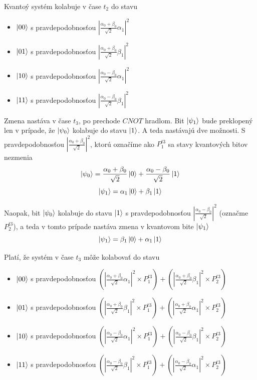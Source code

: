 Kvantoý systém kolabuje v čase \(t_2\) do stavu
    \begin{itemize}
        \item[] \(\ket{00}\) s pravdepodobnosťou \(|\frac{\alpha_0 + \beta_0}{\sqrt{2}}\alpha_1|^2\)
        \item[] \(\ket{01}\) s pravdepodobnosťou \(|\frac{\alpha_0 + \beta_0}{\sqrt{2}}\beta_1|^2\)
        \item[] \(\ket{10}\) s pravdepodobnosťou \(|\frac{\alpha_0 - \beta_0}{\sqrt{2}}\alpha_1|^2\)
        \item[] \(\ket{11}\) s pravdepodobnosťou \(|\frac{\alpha_0 - \beta_0}{\sqrt{2}}\beta_1|^2\) 
    \end{itemize}

Zmena nastáva v čase \(t_3\), po prechode \(CNOT\) hradlom. Bit \(\ket{\psi_1}\)
bude preklopený len v prípade, že \(\ket{\psi_0}\) kolabuje do stavu 
\(\ket{1}\). A teda nastávajú dve možnosti. S pravdepodobnosťou 
\(|\frac{\alpha_0 + \beta_0}{\sqrt{2}}|^2\), ktorú označíme ako \(P^{t3}_1\) sa 
stavy kvantových bitov nezmenia
\[\ket{\psi_0} = \frac{\alpha_0 + \beta_0}{\sqrt{2}}\ket{0} + \frac{\alpha_0 - \beta_0}{\sqrt{2}}\ket{1}\]
\[\ket{\psi_1} = \alpha_1\ket{0} + \beta_1\ket{1}\]

Naopak, bit \(\ket{\psi_0}\) kolabuje do stavu \(\ket{1}\) s pravdepodobnosťou
\(|\frac{\alpha_0 - \beta_0}{\sqrt{2}}|^2\) (označme \(P^{t3}_{2}\)), a teda 
v tomto prípade nastáva zmena v kvantovom bite \(\ket{\psi_1}\)
\[\ket{\psi_1} = \beta_1\ket{0} + \alpha_1\ket{1}\]

Platí, že systém v čase \(t_3\) môže kolabovať do stavu
    \begin{itemize}
        \item[] \(\ket{00}\) s pravdepodobnosťou \((|\frac{\alpha_0 + \beta_0}{\sqrt{2}}\alpha_1|^2 \times P^{t3}_1) + (|\frac{\alpha_0 + \beta_0}{\sqrt{2}}\beta_1|^2 \times P^{t3}_{2})\)
        \item[] \(\ket{01}\) s pravdepodobnosťou \((|\frac{\alpha_0 + \beta_0}{\sqrt{2}}\beta_1|^2 \times P^{t3}_1 ) +(|\frac{\alpha_0 + \beta_0}{\sqrt{2}}\alpha_1|^2 \times P^{t3}_2)\)
        \item[] \(\ket{10}\) s pravdepodobnosťou \((|\frac{\alpha_0 - \beta_0}{\sqrt{2}}\alpha_1|^2 \times P^{t3}_1) +  (|\frac{\alpha_0 - \beta_0}{\sqrt{2}}\beta_1|^2 \times P^{t3}_2)\)
        \item[] \(\ket{11}\) s pravdepodobnosťou \((|\frac{\alpha_0 - \beta_0}{\sqrt{2}}\beta_1|^2 \times P^{t3}_1) +(|\frac{\alpha_0 - \beta_0}{\sqrt{2}}\alpha_1|^2 \times P^{t3}_2)\) 
    \end{itemize}


